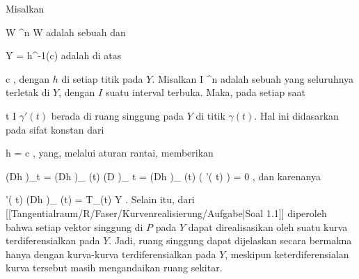 {}
{

Misalkan

\mavergleichskette
{\vergleichskette
{ W
}
{ \subseteq }{ \R^n
}
{  }{
}
{    }{
}
{   }{
}
}
{}{}{}
 { W } { \R
} {}
adalah sebuah
dan

\mavergleichskette
{\vergleichskette
{ Y
}
{ = }{ h^{-1}(c)
}
{  }{
}
{    }{
}
{   }{
}
}
{}{}{}
adalah
di atas

\mavergleichskette
{\vergleichskette
{ c
}
{ \in }{ \R
}
{  }{
}
{    }{
}
{   }{
}
}
{}{}{,}
dengan $h$
di setiap titik pada $Y$. Misalkan
\maabbdisp {\gamma} { I } { \R^n
} {}
adalah sebuah
yang seluruhnya terletak di $Y$, dengan $I$ suatu interval terbuka. Maka, pada setiap saat

\mavergleichskette
{\vergleichskette
{ t
}
{ \in }{ I
}
{  }{
}
{    }{
}
{   }{
}
}
{}{}{}
$\gamma'(t)$ berada di ruang singgung pada $Y$ di titik $\gamma(t)$. Hal ini didasarkan pada sifat konstan dari

\mavergleichskette
{\vergleichskette
{ h \circ \gamma
}
{ = }{ c
}
{  }{
}
{    }{
}
{   }{
}
}
{}{}{,}
yang, melalui aturan rantai, memberikan

\mavergleichskettedisp
{\vergleichskette
{ \left(Dh \circ \gamma\right)_{t}
}
{ =} { \left(Dh  \right)_{ \gamma(t) }  \circ \left(D \gamma  \right)_{ t }
}
{ =} { \left(Dh  \right)_{ \gamma(t) } ( \gamma'( t) )
}
{ =} { 0
}
{ } {
}
}
{}{}{,}
dan karenanya

\mavergleichskette
{\vergleichskette
{ \gamma'( t)
}
{ \in }{   \left(Dh \right)_{ \gamma(t) }
}
{ = }{ T_{\gamma(t) }Y
}
{    }{
}
{   }{
}
}
{}{}{.}
Selain itu, dari
[[Tangentialraum/R/Faser/Kurvenrealisierung/Aufgabe|Soal 1.1]]
diperoleh bahwa setiap vektor singgung di $P$ pada $Y$ dapat direalisasikan oleh suatu kurva terdiferensialkan pada $Y$. Jadi, ruang singgung dapat dijelaskan secara bermakna hanya dengan kurva-kurva terdiferensialkan pada $Y$, meskipun keterdiferensialan kurva tersebut masih mengandaikan ruang sekitar.

}

